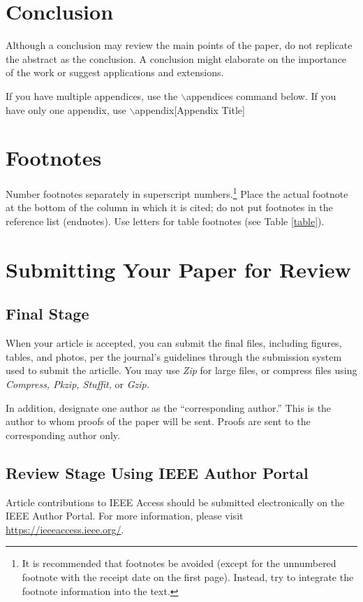 \documentclass{ieeeaccess}
\begin{document}
\section{Conclusion}
Although a conclusion may review the  main points of the paper, do not replicate the abstract as the conclusion. A
conclusion might elaborate on the importance of the work or suggest
applications and extensions.

If you have multiple appendices, use the $\backslash$appendices command below. If you have only one appendix, use
$\backslash$appendix[Appendix Title]

\appendices
\section{\break Footnotes}
Number footnotes separately in superscript numbers.\footnote{It is recommended that footnotes be avoided (except for
the unnumbered footnote with the receipt date on the first page). Instead,
try to integrate the footnote information into the text.} Place the actual
footnote at the bottom of the column in which it is cited; do not put
footnotes in the reference list (endnotes). Use letters for table footnotes
(see Table \ref{table}).

\section{\break Submitting Your Paper for Review}

\subsection{Final Stage}
When your article is accepted, you can submit the final files, including figures, tables, and photos, per the journal's guidelines through the submission system used to submit the articlle.
 You may use \emph{Zip} for large files, or compress files using \emph{Compress, Pkzip, Stuffit,} or \emph{Gzip.}

In addition, designate one author as the ``corresponding author.'' This is the author to
whom proofs of the paper will be sent. Proofs are sent to the corresponding
author only.

\subsection{Review Stage Using IEEE Author Portal}
Article contributions to IEEE Access should be submitted electronically on the IEEE Author Portal. For more information, please visit
\underline{https://ieeeaccess.ieee.org/}.
\end{document}
